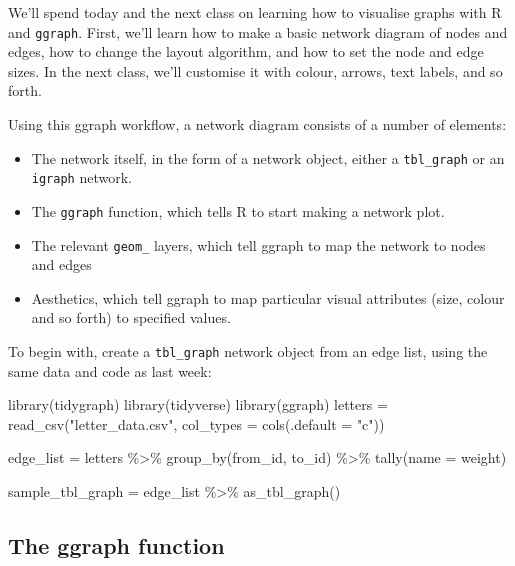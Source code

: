 \documentclass[
]{book}
\newenvironment{Shaded}{\begin{snugshade}}{\end{snugshade}}
\newcommand{\AttributeTok}[1]{\textcolor[rgb]{0.77,0.63,0.00}{#1}}
\newcommand{\FunctionTok}[1]{\textcolor[rgb]{0.00,0.00,0.00}{#1}}
\newcommand{\NormalTok}[1]{#1}
\newcommand{\OtherTok}[1]{\textcolor[rgb]{0.56,0.35,0.01}{#1}}
\newcommand{\SpecialCharTok}[1]{\textcolor[rgb]{0.00,0.00,0.00}{#1}}
\newcommand{\StringTok}[1]{\textcolor[rgb]{0.31,0.60,0.02}{#1}}
\providecommand{\tightlist}{%
  \setlength{\itemsep}{0pt}\setlength{\parskip}{0pt}}
\begin{document}
We'll spend today and the next class on learning how to visualise graphs with R and \texttt{ggraph}. First, we'll learn how to make a basic network diagram of nodes and edges, how to change the layout algorithm, and how to set the node and edge sizes. In the next class, we'll customise it with colour, arrows, text labels, and so forth.

Using this ggraph workflow, a network diagram consists of a number of elements:

\begin{itemize}
\tightlist
\item
  The network itself, in the form of a network object, either a \texttt{tbl\_graph} or an \texttt{igraph} network.
\item
  The \texttt{ggraph} function, which tells R to start making a network plot.
\item
  The relevant \texttt{geom\_} layers, which tell ggraph to map the network to nodes and edges
\item
  Aesthetics, which tell ggraph to map particular visual attributes (size, colour and so forth) to specified values.
\end{itemize}

To begin with, create a \texttt{tbl\_graph} network object from an edge list, using the same data and code as last week:

\begin{Shaded}
\begin{Highlighting}[]
\FunctionTok{library}\NormalTok{(tidygraph)}
\FunctionTok{library}\NormalTok{(tidyverse)}
\FunctionTok{library}\NormalTok{(ggraph)}
\NormalTok{letters }\OtherTok{=} \FunctionTok{read\_csv}\NormalTok{(}\StringTok{"letter\_data.csv"}\NormalTok{, }\AttributeTok{col\_types =} \FunctionTok{cols}\NormalTok{(}\AttributeTok{.default =} \StringTok{"c"}\NormalTok{))}

\NormalTok{edge\_list }\OtherTok{=}\NormalTok{ letters }\SpecialCharTok{\%\textgreater{}\%} 
  \FunctionTok{group\_by}\NormalTok{(from\_id, to\_id) }\SpecialCharTok{\%\textgreater{}\%} 
  \FunctionTok{tally}\NormalTok{(}\AttributeTok{name =} \StringTok{\textquotesingle{}weight\textquotesingle{}}\NormalTok{)}

\NormalTok{sample\_tbl\_graph }\OtherTok{=}\NormalTok{ edge\_list }\SpecialCharTok{\%\textgreater{}\%} 
  \FunctionTok{as\_tbl\_graph}\NormalTok{()}
\end{Highlighting}
\end{Shaded}

\hypertarget{the-ggraph-function}{%
\subsection{The ggraph function}\label{the-ggraph-function}}
\end{document}
